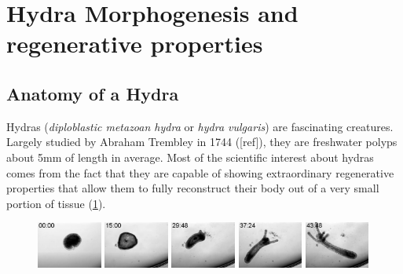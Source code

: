 
\newpage
\section{Hydra Morphogenesis and regenerative properties}

\subsection{Anatomy of a Hydra}

Hydras (\textit{diploblastic metazoan hydra} or \textit{hydra vulgaris}) are fascinating creatures. Largely studied by Abraham Trembley in 1744 ([ref]), they are freshwater polyps about 5mm of length in average. Most of the scientific interest about hydras comes from the fact that they are capable of showing extraordinary regenerative properties that allow them to fully reconstruct their body out of a very small portion of tissue (\ref{hydraregen}).
\begin{figure}[h]
\label{hydraregen}
\includegraphics[width=0.19\textwidth]{figures/hydra_growth1}
\includegraphics[width=0.19\textwidth]{figures/hydra_growth2}
\includegraphics[width=0.19\textwidth]{figures/hydra_growth3}	\includegraphics[width=0.19\textwidth]{figures/hydra_growth4}
\includegraphics[width=0.19\textwidth]{figures/hydra_growth5}
\end{figure}

